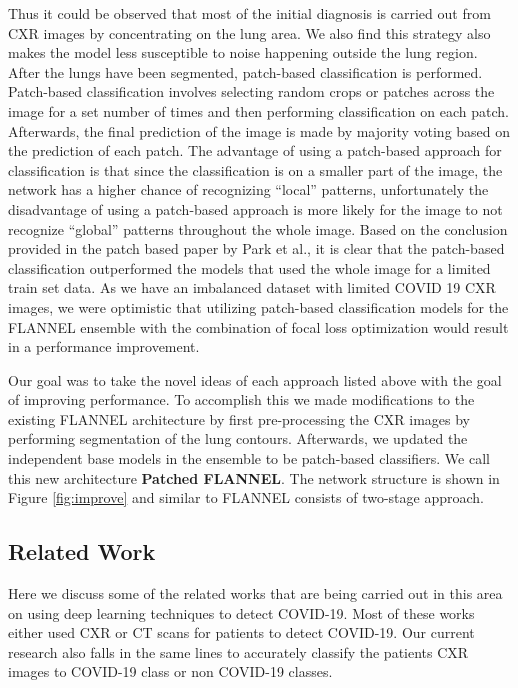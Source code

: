 \documentclass{sigkddExp}
\begin{document}
Thus it could be observed that most of the initial diagnosis is carried out from
CXR images by concentrating on the lung area. We also find this strategy also
makes the model less susceptible to noise happening outside the lung region.
After the lungs have been segmented, patch-based classification is performed.
Patch-based classification involves selecting random crops or patches across the
image for a set number of times and then performing classification on each
patch. Afterwards, the final prediction of the image is made by majority voting
based on the prediction of each patch. The advantage of using a patch-based
approach for classification is that since the classification is on a smaller
part of the image, the network has a higher chance of recognizing “local”
patterns, unfortunately the disadvantage of using a patch-based approach is more
likely for the image to not recognize “global” patterns throughout the whole
image. Based on the conclusion provided in the patch based paper
\cite{pmid32396075} by Park et al., it is clear that the patch-based
classification outperformed the models that used the whole image for a limited
train set data. As we have an imbalanced dataset with limited COVID 19 CXR
images, we were optimistic that utilizing patch-based classification models for
the FLANNEL ensemble with the combination of focal loss optimization would
result in a performance improvement.

Our goal was to take the novel ideas of each approach listed above with the goal
of improving performance. To accomplish this we made modifications to the
existing FLANNEL architecture by first pre-processing the CXR images by
performing segmentation of the lung contours. Afterwards, we updated the
independent base models in the ensemble to be patch-based classifiers. We call
this new architecture \textbf{Patched FLANNEL}. The network structure is shown in
Figure \ref{fig:improve} and similar to FLANNEL consists of two-stage approach.

\subsection{Related Work}

Here we discuss some of the related works that are being carried out in this
area on using deep learning techniques to detect COVID-19. Most of these works
either used CXR or CT scans for patients to detect COVID-19. Our current
research also falls in the same lines to accurately classify the patients CXR
images to COVID-19 class or non COVID-19 classes.
\end{document}
